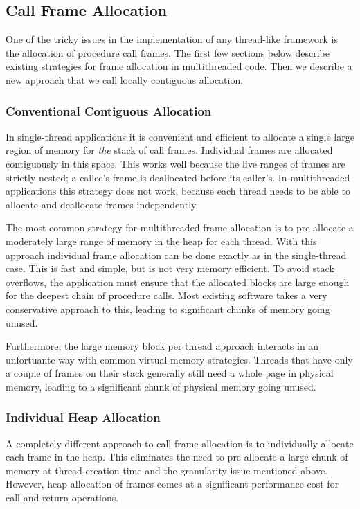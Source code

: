 \documentclass[10pt,preprint]{sigplanconf}
\begin{document}
\subsection{Call Frame Allocation}

One of the tricky issues in the implementation of any thread-like framework is the allocation of procedure call frames.
The first few sections below describe existing strategies for frame allocation in multithreaded code.
Then we describe a new approach that we call locally contiguous allocation.

\subsubsection{Conventional Contiguous Allocation}

In single-thread applications it is convenient and efficient to allocate a single large region of memory for \emph{the} stack of call frames.
Individual frames are allocated contiguously in this space.
This works well because the live ranges of frames are strictly nested; a callee's frame is deallocated before its caller's.
In multithreaded applications this strategy does not work, because each thread needs to be able to allocate and deallocate frames independently.

The most common strategy for multithreaded frame allocation is to pre-allocate a moderately large range of memory in the heap for each thread.
With this approach individual frame allocation can be done exactly as in the single-thread case.
This is fast and simple, but is not very memory efficient.
To avoid stack overflows, the application must ensure that the allocated blocks are large enough for the deepest chain of procedure calls.
Most existing software takes a very conservative approach to this, leading to significant chunks of memory going unused.

Furthermore, the large memory block per thread approach interacts in an unfortuante way with common virtual memory strategies.
Threads that have only a couple of frames on their stack generally still need a whole page in physical memory, leading to a significant chunk of physical memory going unused.

\subsubsection{Individual Heap Allocation}

A completely different approach to call frame allocation is to individually allocate each frame in the heap.
This eliminates the need to pre-allocate a large chunk of memory at thread creation time and the granularity issue mentioned above.
However, heap allocation of frames comes at a significant performance cost for call and return operations.
\end{document}
